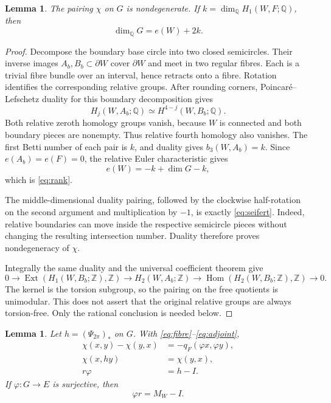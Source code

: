 \documentclass[11pt]{article}
\newtheorem{lemma}[theorem]{Lemma}
\theoremstyle{definition}
\theoremstyle{remark}
\newcommand{\Z}{\mathbb Z}
\newcommand{\Q}{\mathbb Q}
\newcommand{\Hom}{\operatorname{Hom}}
\newcommand{\Ext}{\operatorname{Ext}}
\begin{document}
\begin{lemma}\label{lem:duality}
The pairing $\chi$ on $G$ is nondegenerate. If $k=\dim_{\Q}H_1(W,F;\Q)$, then
\begin{equation}\label{eq:rank}
\dim_{\Q}G=e(W)+2k.
\end{equation}
\end{lemma}
\begin{proof}
Decompose the boundary base circle into two closed semicircles. Their inverse images $A_b,B_b\subset\partial W$ cover $\partial W$ and meet in two regular fibres. Each is a trivial fibre bundle over an interval, hence retracts onto a fibre. Rotation identifies the corresponding relative groups. After rounding corners, Poincar\'e--Lefschetz duality for this boundary decomposition gives
\[
H_j(W,A_b;\Q)\simeq H^{4-j}(W,B_b;\Q).
\]
Both relative zeroth homology groups vanish, because $W$ is connected and both boundary pieces are nonempty. Thus relative fourth homology also vanishes. The first Betti number of each pair is $k$, and duality gives $b_3(W,A_b)=k$. Since $e(A_b)=e(F)=0$, the relative Euler characteristic gives
\[
e(W)=-k+\dim G-k,
\]
which is \eqref{eq:rank}.

The middle-dimensional duality pairing, followed by the clockwise half-rotation on the second argument and multiplication by $-1$, is exactly \eqref{eq:seifert}. Indeed, relative boundaries can move inside the respective semicircle pieces without changing the resulting intersection number. Duality therefore proves nondegeneracy of $\chi$.

Integrally the same duality and the universal coefficient theorem give
\[
0\longrightarrow\Ext(H_1(W,B_b;\Z),\Z)
\longrightarrow H_2(W,A_b;\Z)
\longrightarrow\Hom(H_2(W,B_b;\Z),\Z)\longrightarrow0.
\]
The kernel is the torsion subgroup, so the pairing on the free quotients is unimodular. This does not assert that the original relative groups are always torsion-free. Only the rational conclusion is needed below.
\end{proof}

\begin{lemma}\label{lem:sign}
Let $h=(\Psi_{2\pi})_*$ on $G$. With \eqref{eq:fibre}--\eqref{eq:adjoint},
\begin{align}
\chi(x,y)-\chi(y,x)&=-q_F(\varphi x,\varphi y),\label{eq:skew}\\
\chi(x,hy)&=\chi(y,x),\label{eq:transpose}\\
r\varphi&=h-I.\label{eq:variation}
\end{align}
If $\varphi:G\to E$ is surjective, then
\begin{equation}\label{eq:monodromy}
\varphi r=M_W-I.
\end{equation}
\end{lemma}
\end{document}
